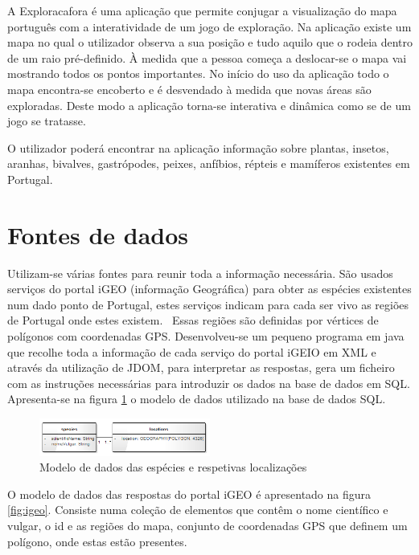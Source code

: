 \documentclass[twocolumn,twoside,11pt,a4paper]{article}
\begin{document}
A Exploracafora é uma aplicação que permite conjugar a visualização do mapa português com a interatividade de um jogo de exploração. Na aplicação existe um mapa no qual o utilizador observa a sua posição e tudo aquilo que o rodeia dentro de um raio pré-definido. À medida que a pessoa começa a deslocar-se o mapa vai mostrando todos os pontos importantes. No início do uso da aplicação todo o mapa encontra-se encoberto e é desvendado à medida que novas áreas são exploradas. Deste modo a aplicação torna-se interativa e dinâmica como se de um jogo se tratasse.

O utilizador poderá encontrar na aplicação informação sobre plantas, insetos, aranhas, bivalves, gastrópodes, peixes, anfíbios, répteis e mamíferos existentes em Portugal. 

\section{Fontes de dados}\label{sec:datamodel}
Utilizam-se várias fontes para reunir toda a informação necessária. São usados serviços do portal iGEO (informação Geográfica) para obter as espécies existentes num dado ponto de Portugal, estes serviços indicam para cada ser vivo as regiões de Portugal onde estes existem.~\cite{igeo} Essas regiões são definidas por vértices de polígonos com coordenadas GPS. Desenvolveu-se um pequeno programa em java que recolhe toda a informação de cada serviço do portal iGEIO em XML e através da utilização de JDOM, para interpretar as respostas, gera um ficheiro com as instruções necessárias para introduzir os dados na base de dados em SQL. Apresenta-se na figura \ref{fig:localizacoes} o modelo de dados utilizado na base de dados SQL. 

\begin{figure}[ht!]
	\begin{center}
		\includegraphics[width=0.50\textwidth]{localizacao_especies}
		\caption{Modelo de dados das espécies e respetivas localizações}
		\label{fig:localizacoes}
	\end{center}
\end{figure} 


O modelo de dados das respostas do portal iGEO é apresentado na figura \ref{fig:igeo}. Consiste numa coleção de elementos que contêm o nome científico e vulgar, o id e as regiões do mapa, conjunto de coordenadas GPS que definem um polígono, onde estas estão presentes.
\end{document}
